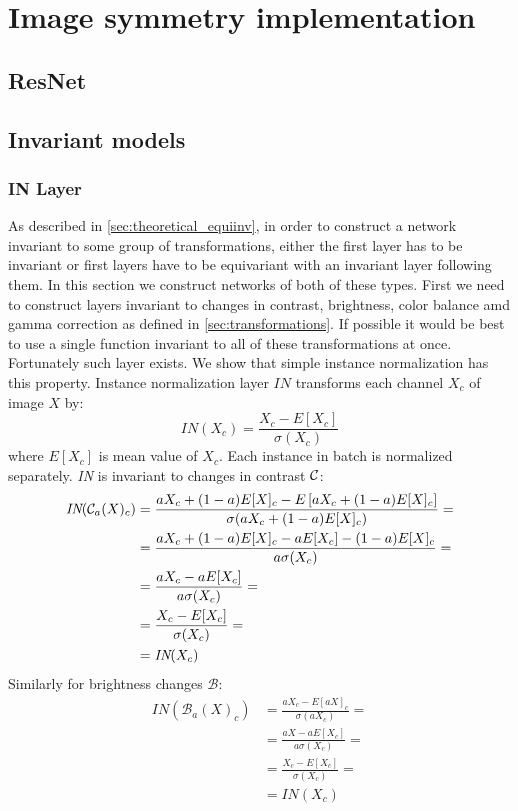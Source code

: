 \section{Image symmetry implementation}

\subsection{ResNet}
\subsection{Invariant models}
\subsubsection{IN Layer}
As described in \ref{sec:theoretical_equiinv}, in order to construct a network
invariant to some group of transformations, either the first layer has to be
invariant or first layers have to be equivariant with an invariant layer
following them. In this section we construct networks of both of these types.
First we need to construct layers invariant to changes in
contrast, brightness, color balance amd gamma correction as defined in
\ref{sec:transformations}. If possible it would be best to use a single function
invariant to all of these transformations at once. Fortunately such layer
exists. We show that simple instance normalization has this property.
Instance normalization layer $\textit{IN}$ transforms each channel
$X_c$ of image $X$ by:
$$ \mathit{IN}(X_c) = \frac{X_c-E[X_c]}{\sigma(X_c)} $$
where $E[X_c]$ is mean value of $X_c$.
Each instance in batch is normalized separately.
\textit{IN} is invariant to changes in contrast $\mathcal{C}$:
\begin{align*}
    \textit{IN}(\mathcal{C}_a(X)_c) &=
    \frac{aX_c+(1-a)E[X]_c - E\left[aX_c+(1-a)E[X]_c\right]}{\sigma(aX_c+(1-a)E[X]_c)} = \\
    &= \frac{aX_c+(1-a)E[X]_c - aE[X_c]-(1-a)E[X]_c}{a\sigma(X_c)} = \\
    &= \frac{aX_c-aE[X_c]}{a\sigma(X_c)} = \\
    &= \frac{X_c-E[X_c]}{\sigma(X_c)} = \\
    &= \textit{IN}(X_c)
\end{align*}
Similarly for brightness changes $\mathcal{B}$:
\begin{align*}
    \textit{IN}(\mathcal{B}_a(X)_c) &=
    \frac{aX_c - E\left[aX\right]_c}{\sigma(aX_c)} = \\
    &= \frac{aX-aE[X_c]}{a\sigma(X_c)} = \\
    &= \frac{X_c-E[X_c]}{\sigma(X_c)} = \\
    &= \textit{IN}(X_c)
\end{align*}

